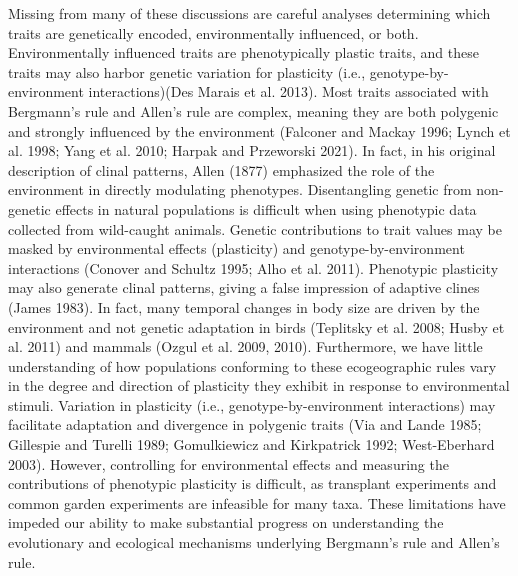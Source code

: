 \documentclass[
]{article}
\begin{document}
Missing from many of these discussions are careful analyses determining
which traits are genetically encoded, environmentally influenced, or
both. Environmentally influenced traits are phenotypically plastic
traits, and these traits may also harbor genetic variation for
plasticity (i.e., genotype-by-environment interactions)(Des Marais et
al. 2013). Most traits associated with Bergmann's rule and Allen's rule
are complex, meaning they are both polygenic and strongly influenced by
the environment (Falconer and Mackay 1996; Lynch et al. 1998; Yang et
al. 2010; Harpak and Przeworski 2021). In fact, in his original
description of clinal patterns, Allen (1877) emphasized the role of the
environment in directly modulating phenotypes. Disentangling genetic
from non-genetic effects in natural populations is difficult when using
phenotypic data collected from wild-caught animals. Genetic
contributions to trait values may be masked by environmental effects
(plasticity) and genotype-by-environment interactions (Conover and
Schultz 1995; Alho et al. 2011). Phenotypic plasticity may also generate
clinal patterns, giving a false impression of adaptive clines (James
1983). In fact, many temporal changes in body size are driven by the
environment and not genetic adaptation in birds (Teplitsky et al. 2008;
Husby et al. 2011) and mammals (Ozgul et al. 2009, 2010). Furthermore,
we have little understanding of how populations conforming to these
ecogeographic rules vary in the degree and direction of plasticity they
exhibit in response to environmental stimuli. Variation in plasticity
(i.e., genotype-by-environment interactions) may facilitate adaptation
and divergence in polygenic traits (Via and Lande 1985; Gillespie and
Turelli 1989; Gomulkiewicz and Kirkpatrick 1992; West-Eberhard 2003).
However, controlling for environmental effects and measuring the
contributions of phenotypic plasticity is difficult, as transplant
experiments and common garden experiments are infeasible for many taxa.
These limitations have impeded our ability to make substantial progress
on understanding the evolutionary and ecological mechanisms underlying
Bergmann's rule and Allen's rule.
\end{document}
